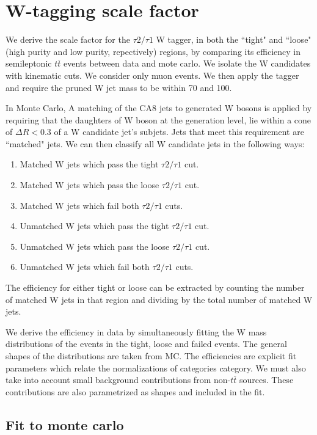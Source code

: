 \clearpage
\section{W-tagging scale factor}




\iffalse

We derive the scale factor for the $\tau 2/\tau 1$ W tagger, in both the ``tight" and ``loose" 
(high purity and low purity, repectively) regions, by
comparing its efficiency in semileptonic $t\overline{t}$ events between
data and mote carlo. We isolate the W candidates with kinematic
cuts. We consider only muon events. We then apply the tagger and require the pruned W jet mass to be within 70 and 100\GeVcc.

In Monte Carlo, A matching of the CA8 jets to generated W bosons is applied by
requiring that the daughters of W boson at the generation level, lie within a
cone of $\Delta R < 0.3$ of a W candidate jet's subjets. Jets that meet this
requirement are ``matched" jets. We can then classify all W
candidate jets in the following ways:
\begin{enumerate}
\item Matched W jets which pass the tight $\tau 2/\tau 1$ cut.
\item Matched W jets which pass the loose $\tau 2/\tau 1$ cut.
\item Matched W jets which fail both $\tau 2/\tau 1$ cuts.
\item Unmatched W jets which pass the tight $\tau 2/\tau 1$ cut.
\item Unmatched W jets which pass the loose $\tau 2/\tau 1$ cut.
\item Unmatched W jets which fail both $\tau 2/\tau 1$ cuts.
\end{enumerate}
The efficiency for either tight or loose can be extracted by counting the number of matched
W jets in that region and dividing by the total number of
matched W jets.

We derive the efficiency in data by simultaneously fitting the
W mass distributions of the events in the tight, loose and failed events. The general shapes of the distributions are taken from MC. The efficiencies are explicit fit parameters which relate the normalizations of categories category. We must also take into account small background contributions from non-$t\overline{t}$ sources. These contributions are also parametrized as shapes and included in the fit.

\subsection{Fit to monte carlo}

